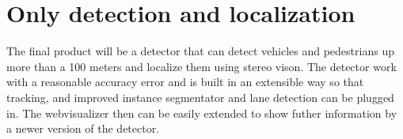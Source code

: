 \section{Only detection and localization}

The final product will be a detector that can detect vehicles and pedestrians up
more than a 100 meters and localize them using stereo vison. The detector work
with a reasonable accuracy error and is built in an extensible way so that
tracking, and improved instance segmentator and lane detection can be plugged
in. The webvisualizer then can be easily extended to show futher information by
a newer version of the detector.